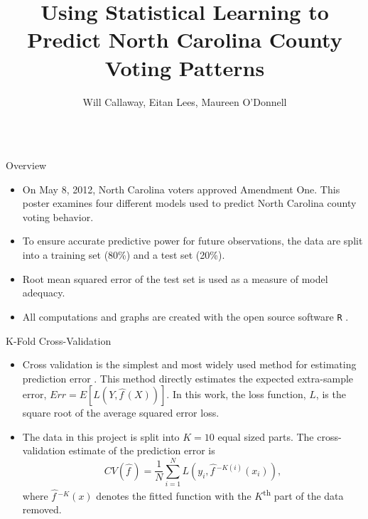 \documentclass[final]{beamer}\usepackage[]{graphicx}\usepackage[]{color}
\title{Using Statistical Learning to Predict North Carolina County Voting Patterns}
\author{Will Callaway, Eitan Lees, Maureen O'Donnell}
\institute{Department of Mathematical Sciences}
\begin{document}
\begin{frame}[fragile]
\vspace{-2ex}
\begin{columns}[t]



\begin{column}{0.31\linewidth}
\begin{minipage}[t][.955\textheight]{\linewidth} 
\begin{block}{Overview}
\begin{itemize}
\item On May 8, 2012, North Carolina voters approved Amendment One.  This poster examines four different models used to predict North Carolina county voting behavior.  
\item To ensure accurate predictive power for future observations, the data are split into a training set (80\%) and a test set (20\%). 
\item Root mean squared error of the test set is used as a measure of model adequacy.  
\item All computations and graphs are created with the open source software \texttt{R} \cite{R-base}. 
\end{itemize}
\vspace{0ex}
\end{block}
\vfill

\begin{block}{K-Fold Cross-Validation}
\begin{itemize}
\item Cross validation is the simplest and most widely used method for estimating prediction error \cite{JF09}.  This method directly estimates the expected extra-sample error, $Err = E[{L(Y, \hat{f\,}\!(X))}]$.  In this work, the loss function, $L$, is the square root of the average squared error loss.
\vspace{2ex}
\item The data in this project is split into $K=10$ equal sized parts.  The cross-validation estimate of the prediction error is $$CV(\hat{f\,}\!)=\frac{1}{N}\sum_{i=1}^{N}L(y_i, \hat{f\,}\!^{-K(i)}(x_i)),$$
where $\hat{f\,}\!^{-K}(x)$ denotes the fitted function with the $K$\textsuperscript{th} part of the data removed.
\end{itemize}
\vspace{0ex}
\vfill
\end{block}
\vfill


\end{minipage}
\end{column}
\end{columns}
\end{frame}
\end{document}
